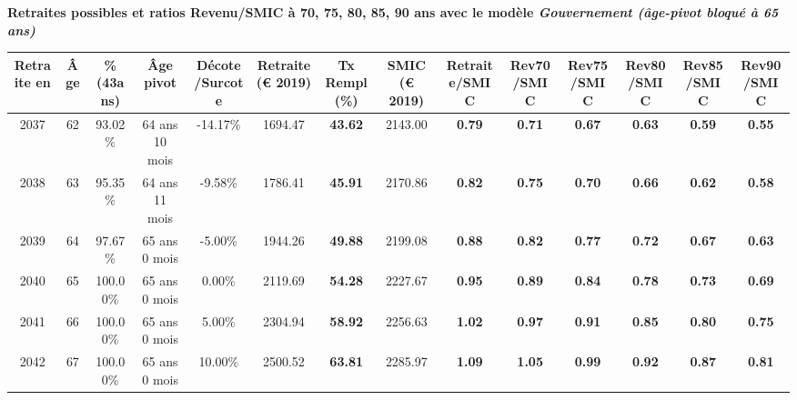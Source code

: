 {\bf \noindent Retraites possibles et ratios Revenu/SMIC à 70, 75, 80, 85, 90 ans avec le modèle \emph{Gouvernement (âge-pivot bloqué à 65 ans)}}  
 
\begin{adjustbox}{max width=\textwidth} 
\begin{tabular}[htb]{|c|c||c|c|c||c|c||c||c|c|c|c|c|c|} 
\hline 
 Retraite en &  Âge &  \%(43ans) &  Âge pivot &  Décote/Surcote &  Retraite (\euro{} 2019) &  Tx Rempl(\%) &  SMIC (\euro{} 2019) &  Retraite/SMIC &  Rev70/SMIC &  Rev75/SMIC &  Rev80/SMIC &  Rev85/SMIC &  Rev90/SMIC \\ 
\hline \hline 
 2037 &  62 &  93.02\% &  64 ans 10 mois &  -14.17\% &  1694.47 &  {\bf 43.62} &  2143.00 &  {\bf {\color{red} 0.79}} &  {\bf {\color{red} 0.71}} &  {\bf {\color{red} 0.67}} &  {\bf {\color{red} 0.63}} &  {\bf {\color{red} 0.59}} &  {\bf {\color{red} 0.55}} \\ 
\hline 
 2038 &  63 &  95.35\% &  64 ans 11 mois &  -9.58\% &  1786.41 &  {\bf 45.91} &  2170.86 &  {\bf {\color{red} 0.82}} &  {\bf {\color{red} 0.75}} &  {\bf {\color{red} 0.70}} &  {\bf {\color{red} 0.66}} &  {\bf {\color{red} 0.62}} &  {\bf {\color{red} 0.58}} \\ 
\hline 
 2039 &  64 &  97.67\% &  65 ans 0 mois &  -5.00\% &  1944.26 &  {\bf 49.88} &  2199.08 &  {\bf {\color{red} 0.88}} &  {\bf {\color{red} 0.82}} &  {\bf {\color{red} 0.77}} &  {\bf {\color{red} 0.72}} &  {\bf {\color{red} 0.67}} &  {\bf {\color{red} 0.63}} \\ 
\hline 
 2040 &  65 &  100.00\% &  65 ans 0 mois &  0.00\% &  2119.69 &  {\bf 54.28} &  2227.67 &  {\bf {\color{red} 0.95}} &  {\bf {\color{red} 0.89}} &  {\bf {\color{red} 0.84}} &  {\bf {\color{red} 0.78}} &  {\bf {\color{red} 0.73}} &  {\bf {\color{red} 0.69}} \\ 
\hline 
 2041 &  66 &  100.00\% &  65 ans 0 mois &  5.00\% &  2304.94 &  {\bf 58.92} &  2256.63 &  {\bf 1.02} &  {\bf {\color{red} 0.97}} &  {\bf {\color{red} 0.91}} &  {\bf {\color{red} 0.85}} &  {\bf {\color{red} 0.80}} &  {\bf {\color{red} 0.75}} \\ 
\hline 
 2042 &  67 &  100.00\% &  65 ans 0 mois &  10.00\% &  2500.52 &  {\bf 63.81} &  2285.97 &  {\bf 1.09} &  {\bf 1.05} &  {\bf {\color{red} 0.99}} &  {\bf {\color{red} 0.92}} &  {\bf {\color{red} 0.87}} &  {\bf {\color{red} 0.81}} \\ 
\hline 
\hline 
\end{tabular} 
\end{adjustbox} 
 
